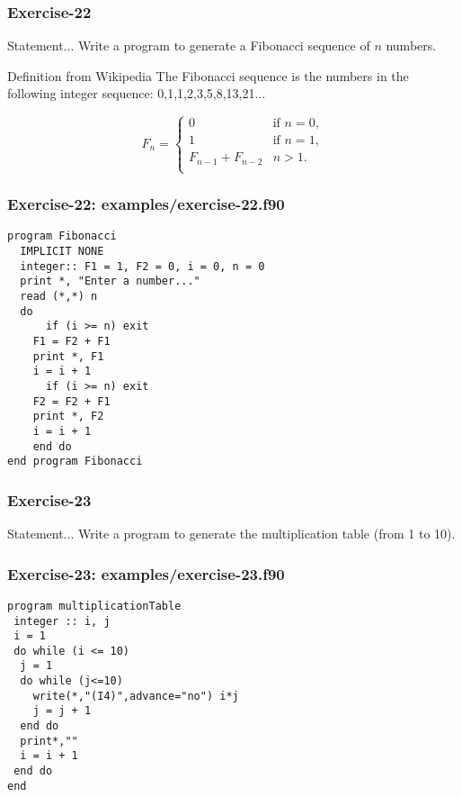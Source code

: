 \documentclass[xcolor=dvipsnames,dvip,notes=show,table]{beamer}
\begin{document}
\begin{frame}[fragile]
\frametitle{Exercise-22}
\begin{block}{Statement...}
Write a program to generate a Fibonacci sequence of $n$ numbers.
\end{block}
% 
\begin{exampleblock}{Definition from Wikipedia}
The Fibonacci sequence is the numbers in the following integer sequence:
0,1,1,2,3,5,8,13,21...
\end{exampleblock}


\begin{equation}
F_n = \begin{cases}
0 & \text{if } n = 0, \\
1 & \text{if } n = 1, \\
F_{n-1} + F_{n-2} & n > 1.\\
\end{cases}
\end{equation}



\end{frame}


\begin{frame}[fragile]
\frametitle{Exercise-22: examples/exercise-22.f90}
\scriptsize
\begin{lstlisting}
program Fibonacci
  IMPLICIT NONE
  integer:: F1 = 1, F2 = 0, i = 0, n = 0
  print *, "Enter a number..."
  read (*,*) n
  do 
      if (i >= n) exit
	F1 = F2 + F1
	print *, F1
	i = i + 1
      if (i >= n) exit
	F2 = F2 + F1
	print *, F2
	i = i + 1
    end do
end program Fibonacci
\end{lstlisting}
\end{frame}

\begin{frame}[fragile]
\frametitle{Exercise-23}
\begin{block}{Statement...}
Write a program to generate the multiplication table (from 1 to 10).
\end{block}
% 
\end{frame}

\begin{frame}[fragile]
\frametitle{Exercise-23: examples/exercise-23.f90}
\scriptsize
\begin{lstlisting}
program multiplicationTable
 integer :: i, j
 i = 1
 do while (i <= 10)
  j = 1
  do while (j<=10)
    write(*,"(I4)",advance="no") i*j
    j = j + 1
  end do
  print*,""
  i = i + 1
 end do
end
\end{lstlisting}
\end{frame}
\end{document}
